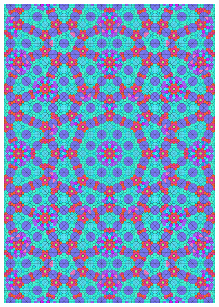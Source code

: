 \documentclass[text.tex]{subfiles}
\begin{document}
\begin{figure}[h!]
\centering
\includegraphics[width=1\textwidth]{img/results/circle8/quasi_circle_111810_(-2261_937alpha_1).pdf}
\end{figure}
\end{document}
